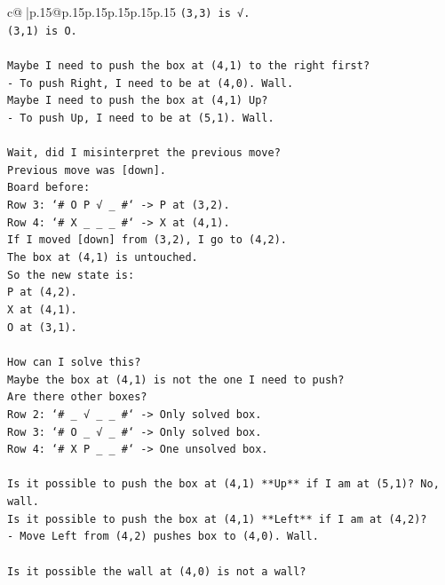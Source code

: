 \documentclass{article}
\begin{document}
{\begin{supertabular}{c@{$\;$}|p{.15\linewidth}@{}p{.15\linewidth}p{.15\linewidth}p{.15\linewidth}p{.15\linewidth}p{.15\linewidth}}
{{{\texttt{(3,3) is √.} \\
\texttt{(3,1) is O.} \\
\\ 
\texttt{Maybe I need to push the box at (4,1) to the right first?} \\
\texttt{{-} To push Right, I need to be at (4,0). Wall.} \\
\texttt{Maybe I need to push the box at (4,1) Up?} \\
\texttt{{-} To push Up, I need to be at (5,1). Wall.} \\
\\ 
\texttt{Wait, did I misinterpret the previous move?} \\
\texttt{Previous move was {[}down{]}.} \\
\texttt{Board before:} \\
\texttt{Row 3: `\# O P √ \_ \#` {-}> P at (3,2).} \\
\texttt{Row 4: `\# X \_ \_ \_ \#` {-}> X at (4,1).} \\
\texttt{If I moved {[}down{]} from (3,2), I go to (4,2).} \\
\texttt{The box at (4,1) is untouched.} \\
\texttt{So the new state is:} \\
\texttt{P at (4,2).} \\
\texttt{X at (4,1).} \\
\texttt{O at (3,1).} \\
\\ 
\texttt{How can I solve this?} \\
\texttt{Maybe the box at (4,1) is not the one I need to push?} \\
\texttt{Are there other boxes?} \\
\texttt{Row 2: `\# \_ √ \_ \_ \#` {-}> Only solved box.} \\
\texttt{Row 3: `\# O \_ √ \_ \#` {-}> Only solved box.} \\
\texttt{Row 4: `\# X P \_ \_ \#` {-}> One unsolved box.} \\
\\ 
\texttt{Is it possible to push the box at (4,1) **Up** if I am at (5,1)? No, wall.} \\
\texttt{Is it possible to push the box at (4,1) **Left** if I am at (4,2)?} \\
\texttt{{-} Move Left from (4,2) pushes box to (4,0). Wall.} \\
\\ 
\texttt{Is it possible the wall at (4,0) is not a wall?} \\
}}}
\end{supertabular}}
\end{document}
